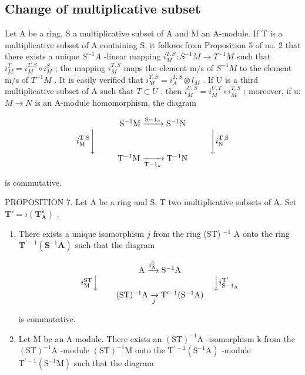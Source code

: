 \subsection{Change of multiplicative subset}

Let A be a ring, S a multiplicative subset of A and M an A-module. If T is a multiplicative subset of A containing S, it follows from Proposition 5 of no. 2 that there exists a unique \(S^{-1}A\) -linear mapping \(i_{M}^{T,S}:S^{-1}M\to T^{-1}M\) such that \(i_{M}^{T}=i_{M}^{T,S}\circ i_{M}^{S}\) ; the mapping \(i_{M}^{T,S}\) maps the element m/s of \(S^{-1}M\) to the element m/s of \(T^{-1}M\) . It is easily verified that \(i_{M}^{T,S}=i_{A}^{T,S}\otimes l_{M}\) . If U is a third multiplicative subset of A such that \(T\subset U\) , then \(i_{M}^{U,S}=i_{M}^{U,T}\circ i_{M}^{T,S}\) ; moreover, if u: \(M\to N\) is an A-module homomorphism, the diagram

\[
\begin{array}{c} \mathrm{S} ^ {- 1} \mathrm{M} \xrightarrow {\mathrm{S} - 1 _ {u}} \mathrm{S} ^ {- 1} \mathrm{N} \\ i _ {\mathrm{M}} ^ {\mathrm{T}, \mathrm{S}} \Biggl \downarrow \qquad \qquad \qquad \qquad \qquad \qquad \qquad \Biggl \downarrow i _ {\mathrm{N}} ^ {\mathrm{T}, \mathrm{S}} \\ \mathrm{T} ^ {- 1} \mathrm{M} \xrightarrow [ \mathrm{T} - 1 _ {u} ]{} \mathrm{T} ^ {- 1} \mathrm{N} \end{array}
\]

is commutative.

PROPOSITION 7. Let A be a ring and S, T two multiplicative subsets of A. Set \(\mathbf{T}' = i(\mathbf{T}_{\mathbf{A}}^{\mathbf{s}})\) .

\begin{enumerate}
\def\labelenumi{(\roman{enumi})}
\tightlist
\item
  There exists a unique isomorphism \(j\) from the ring (ST) \(^{-1}\) A onto the ring \(\mathbf{T}^{\prime -1}(\mathbf{S}^{-1}\mathbf{A})\) such that the diagram

\[
\begin{array}{c} \mathrm{A} \xrightarrow {i _ {\mathrm{A}} ^ {\mathrm{S}}} \mathrm{S} ^ {- 1} \mathrm{A} \\ i _ {\mathrm{M}} ^ {\mathrm{ST}} \Big \downarrow \qquad \qquad \qquad \qquad \qquad \qquad \qquad \Big \downarrow i _ {\mathrm{S} - 1 _ {\mathrm{A}}} ^ {\mathrm{T} ^ {\prime}} \\ (\mathrm{ST}) ^ {- 1} \mathrm{A} \xrightarrow [ j ]{} \mathrm{T} ^ {\prime - 1} (\mathrm{S} ^ {- 1} \mathrm{A}) \end{array}
\]

is commutative.

\item
  Let M be an A-module. There exists an \((\mathrm{ST})^{-1}\mathrm{A}\) -isomorphism k from the \((\mathrm{ST})^{-1}\mathrm{A}\) -module \((\mathrm{ST})^{-1}\mathrm{M}\) onto the \(\mathrm{T}^{\prime-1}(\mathrm{S}^{-1}\mathrm{A})\) -module \(\mathrm{T}^{\prime-1}(\mathrm{S}^{-1}\mathrm{M})\) such that the diagram
\end{enumerate}

